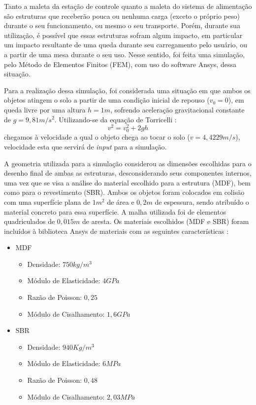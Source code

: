 Tanto a maleta da estação de controle quanto a maleta do sistema de alimentação são estruturas que receberão pouca ou nenhuma carga (exceto o próprio peso) durante o seu funcionamento, ou mesmo o seu transporte. Porém, durante sua utilização, é possível que essas estruturas sofram algum impacto, em particular um impacto resultante de uma queda durante seu carregamento pelo usuário, ou a partir de uma mesa durante o seu uso. Nesse sentido, foi feita uma simulação, pelo Método de Elementos Finitos (FEM), com  uso do software Ansys, dessa situação.
\par Para a realização dessa simulação, foi considerada uma situação em que ambos os objetos atingem o solo a partir de uma condição inicial de repouso ($v_0 = 0$), em queda livre por uma altura $h = 1m$, sofrendo aceleração gravitacional constante de $g = 9,81 m/s^2$. Utilizando-se da equação de Torricelli \cite{hughd.young;rogera.freedman2008}:
\begin{equation}
    v^2 = v_0^2 + 2gh
\end{equation}
chegamos à velocidade a qual o objeto chega ao tocar o solo ($v = 4,4229 m/s$), velocidade esta que servirá de \textit{input} para a simulação.
\par A geometria utilizada para a simulação considerou as dimensões escolhidas para o desenho final de ambas as estruturas, desconsiderando seus componentes internos, uma vez que se visa a análise do material escolhido para a estrutura (MDF), bem como para o revestimento (SBR). Ambos os objetos foram colocados em colisão com uma superfície plana de $1m^2$ de área e $0,2m$ de espessura, sendo atribuído o material concreto para essa superfície. A malha utilizada foi de elementos quadriculados de $0,015m$ de aresta.
    Os materiais escolhidos (MDF e SBR) foram incluídos à biblioteca Ansys de materiais com as seguintes características \cite{azomaterials} \cite{makeitfrom.com}:
    \begin{itemize}
        \item MDF
        \begin{itemize}
            \item Densidade: $750 kg/m^3$
            \item Módulo de Elasticidade: $4 GPa$
            \item Razão de Poisson: $0,25$
            \item Módulo de Cisalhamento: $1,6 GPa$
        \end{itemize}
        \item SBR
        \begin{itemize}
            \item Densidade: $940 Kg/m^3$
            \item Módulo de Elasticidade: $ 6MPa$
            \item Razão de Poisson: $0,48$
            \item Módulo de Cisalhamento: $2,03 MPa$
        \end{itemize}
    \end{itemize}

